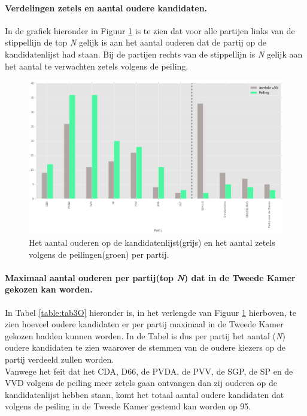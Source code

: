  
\paragraph{Verdelingen zetels en aantal oudere kandidaten.}
In de grafiek hieronder in Figuur \ref{fig:zetelsO} is te zien dat voor alle partijen links van de stippellijn de top \textit{N} gelijk is aan het aantal ouderen dat de partij op de kandidatenlijst had staan. Bij de partijen rechts van de stippellijn is \textit{N} gelijk aan het aantal te verwachten zetels volgens de peiling. 

 
\begin{figure}[H]

	\includegraphics[width=0.98\linewidth]	{Aantal_ouderen_aantal_zetels.png}

			\caption{Het aantal ouderen op de kandidatenlijst(grijs) en het aantal zetels volgens de peilingen(groen) per partij.}

\label{fig:zetelsO}
\end{figure}

\paragraph{Maximaal aantal ouderen per partij(top \textit{N}) dat in de Tweede Kamer gekozen kan worden.}
In Tabel \ref{table:tab3O} hieronder is, in het verlengde van Figuur \ref{fig:zetelsO} hierboven, te zien hoeveel oudere kandidaten er per partij maximaal in de Tweede Kamer gekozen hadden kunnen worden. In de Tabel is dus per partij het aantal (\textit{N}) oudere kandidaten te zien waarover de stemmen van de oudere kiezers op de partij verdeeld zullen worden.  
\\
\indent Vanwege het feit dat het CDA, D66, de PVDA, de PVV, de SGP, de SP en de VVD volgens de peiling meer zetels gaan ontvangen dan zij ouderen op de kandidatenlijst hebben staan, komt het totaal aantal oudere kandidaten dat volgens de peiling in de Tweede Kamer gestemd kan worden op 95.




